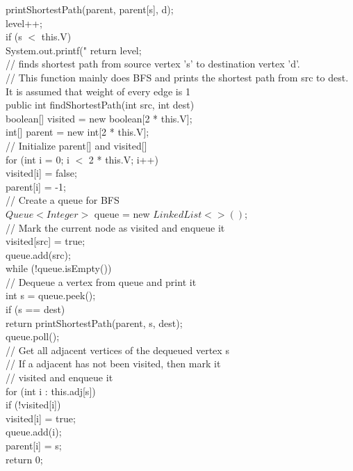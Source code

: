 \documentclass{article}
\begin{document}
\begin{enumerate}
{{{{			}
			printShortestPath(parent, parent[s], d);\\
			level++;\\
			if (s $<$ this.V)\\
				System.out.printf("%
			return level;\\
		}
		// finds shortest path from source vertex 's' to destination vertex 'd'.\\
		// This function mainly does BFS and prints the shortest path from src to dest. It is assumed that weight of every edge is 1\\		
		public int findShortestPath(int src, int dest)\\
		{
			boolean[] visited = new boolean[2 * this.V];\\
			int[] parent = new int[2 * this.V];\\
			// Initialize parent[] and visited[]\\
			for (int i = 0; i $<$ 2 * this.V; i++)\\
			{
				visited[i] = false;\\
				parent[i] = -1;\\
			}
			// Create a queue for BFS\\
			$Queue<Integer>$ queue = new $LinkedList<>()$;\\
			// Mark the current node as visited and enqueue it\\
			visited[src] = true;\\
			queue.add(src);\\
			while (!queue.isEmpty())\\
			{
				// Dequeue a vertex from queue and print it\\
				int s = queue.peek();\\
				if (s == dest)\\
					return printShortestPath(parent, s, dest);\\
				queue.poll();\\
				// Get all adjacent vertices of the dequeued vertex s\\
				// If a adjacent has not been visited, then mark it\\
				// visited and enqueue it\\
				for (int i : this.adj[s])\\
				{
					if (!visited[i])\\
					{
						visited[i] = true;\\
						queue.add(i);\\
						parent[i] = s;\\
					}
				}
			}
			return 0;\\
		}
	}

}
\end{enumerate}
\end{document}
